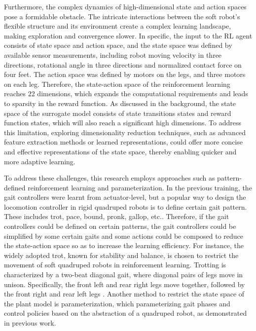 Furthermore, the complex dynamics of high-dimensional state and action spaces pose a formidable obstacle. The intricate interactions between the soft robot's flexible structure and its environment create a complex learning landscape\cite{arulkumaranDeepReinforcementLearning2017}, making exploration and convergence slower. In specific, the input to the \ac{RL} agent consists of state space and action space, and the state space was defined by available sensor measurements, including robot moving velocity in three directions, rotational angle in three directions and normalized contact force on four feet. The action space was defined by motors on the legs, and three motors on each leg. Therefore, the state-action space of the reinforcement learning reaches 22 dimensions, which expands the computational requirements and leads to sparsity in the reward function. As discussed in the background, the state space of the surrogate model consists of state transitions states and reward function states, which will also reach a significant high dimensions. To address this limitation, exploring dimensionality reduction techniques, such as advanced feature extraction methods\cite{polydorosSurveyModelBasedReinforcement2017} or learned representations\cite{wangBenchmarkingModelBasedReinforcement2019}, could offer more concise and effective representations of the state space, thereby enabling quicker and more adaptive learning. 

To address these challenges, this research employs approaches such as pattern-defined reinforcement learning and parameterization. In the previous training\cite{jiSynthesizingOptimalGait2022}, the gait controllers were learnt from actuator-level, but a popular way to design the locomotion controller in rigid quadruped robots is to define certain gait pattern\cite{zhongAnalysisResearchQuadruped2019}. These includes trot, pace, bound, pronk, gallop, etc.\cite{zhongAnalysisResearchQuadruped2019}. Therefore, if the gait controllers could be defined on certain patterns, the gait controllers could be simplified by some certain gaits and some actions could be composed to reduce the state-action space so as to increase the learning efficiency\cite{owakiQuadrupedRobotExhibiting2017}. For instance, the widely adopted trot, known for stability and balance\cite{allenKinematicGaitAnalysis1994}, is chosen to restrict the movement of soft quadruped robots in reinforcement learning. Trotting is characterized by a two-beat diagonal gait, where diagonal pairs of legs move in unison. Specifically, the front left and rear right legs move together, followed by the front right and rear left legs \cite{fletcherTrot2012}. Another method to restrict the state space of the plant model is parameterization, which parameterizing gait phases and control policies based on the abstraction of a quadruped robot\cite{shaoLearningFreeGait2022}, as demonstrated in previous work\cite{jiOmnidirectionalWalkingQuadruped2022}.

